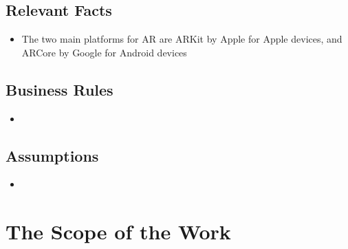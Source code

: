 \documentclass[12pt]{article}
\begin{document}
\subsection{Relevant Facts}
\begin{itemize}
  \item The two main platforms for AR are ARKit by Apple for Apple devices, and ARCore by Google for Android devices
\end{itemize}

\subsection{Business Rules}
\begin{itemize}
  \item
\end{itemize}

\subsection{Assumptions}
\begin{itemize}
  \item
\end{itemize}

\section{The Scope of the Work}
\end{document}
